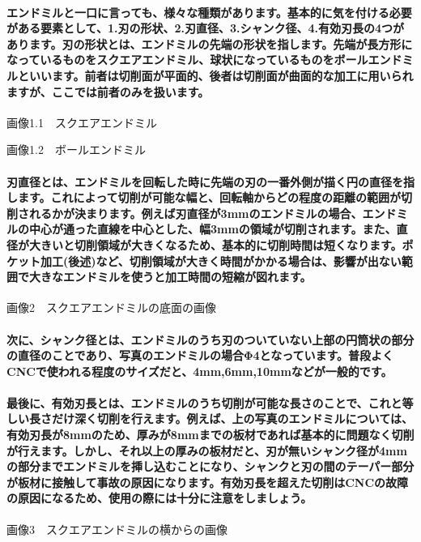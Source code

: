 \documentclass[b5paper, 9pt, twocolumn, titlepage]{jsbook}%
\begin{document}
\paragraph{エンドミルと一口に言っても、様々な種類があります。基本的に気を付ける必要がある要素として、1.刃の形状、2.刃直径、3.シャンク径、4.有効刃長の4つがあります。刃の形状とは、エンドミルの先端の形状を指します。先端が長方形になっているものをスクエアエンドミル、球状になっているものをボールエンドミルといいます。前者は切削面が平面的、後者は切削面が曲面的な加工に用いられますが、ここでは前者のみを扱います。}

画像1.1　スクエアエンドミル

画像1.2　ボールエンドミル

\paragraph{刃直径とは、エンドミルを回転した時に先端の刃の一番外側が描く円の直径を指します。これによって切削が可能な幅と、回転軸からどの程度の距離の範囲が切削されるかが決まります。例えば刃直径が3mmのエンドミルの場合、エンドミルの中心が通った直線を中心とした、幅3mmの領域が切削されます。また、直径が大きいと切削領域が大きくなるため、基本的に切削時間は短くなります。ポケット加工(後述)など、切削領域が大きく時間がかかる場合は、影響が出ない範囲で大きなエンドミルを使うと加工時間の短縮が図れます。}

画像2　スクエアエンドミルの底面の画像

\paragraph{次に、シャンク径とは、エンドミルのうち刃のついていない上部の円筒状の部分の直径のことであり、写真のエンドミルの場合Φ4となっています。普段よくCNCで使われる程度のサイズだと、4mm,6mm,10mmなどが一般的です。}
\paragraph{最後に、有効刃長とは、エンドミルのうち切削が可能な長さのことで、これと等しい長さだけ深く切削を行えます。例えば、上の写真のエンドミルについては、有効刃長が8mmのため、厚みが8mmまでの板材であれば基本的に問題なく切削が行えます。しかし、それ以上の厚みの板材だと、刃が無いシャンク径が4mmの部分までエンドミルを挿し込むことになり、シャンクと刃の間のテーパー部分が板材に接触して事故の原因になります。有効刃長を超えた切削はCNCの故障の原因になるため、使用の際には十分に注意をしましょう。}

画像3　スクエアエンドミルの横からの画像
\end{document}
